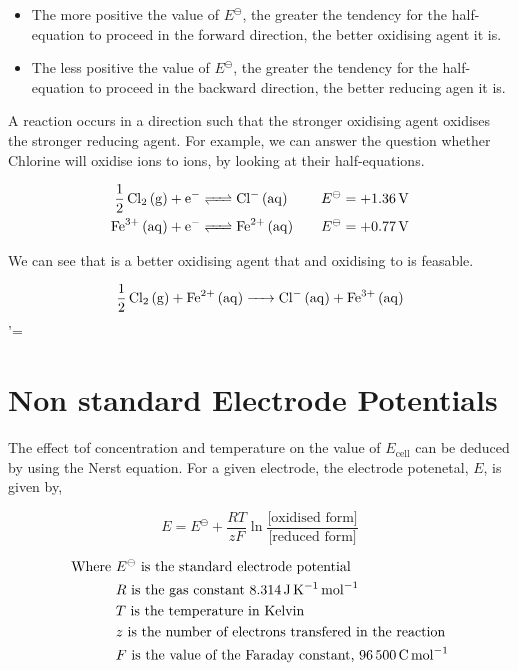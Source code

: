 \documentclass{scrbook}
\begin{document}
	\begin{itemize}
		\item
			The more positive the value of $E^\ominus$, the greater the tendency for the half-equation to proceed in the forward direction, the better oxidising agent it is.
		\item
			The less positive the value of $E^\ominus$, the greater the tendency for the half-equation to proceed in the backward direction, the better reducing agen it is.
	\end{itemize}

	A reaction occurs in a direction such that the stronger oxidising agent oxidises the stronger reducing agent. For example, we can answer the question whether Chlorine will oxidise  ions to  ions, by looking at their half-equations.

	\begin{align*}
		\ce{ 1/2Cl2 (g) + e- &<=> Cl- (aq)} && &E^\ominus &= \SI[explicit-sign=+]{1.36}{\volt} \\
		\ce{ Fe^{3+} (aq) + e- &<=> Fe^{2+} (aq) } && &E^\ominus &= \SI[explicit-sign=+]{0.77}{\volt}
	\end{align*}

	We can see that  is a better oxidising agent that  and  oxidising  to  is feasable.

	\[ \ce{1/2Cl2 (g) + Fe^{2+} (aq) -> Cl- (aq) + Fe^{3+} (aq) } \]'=

\section{Non standard Electrode Potentials}

	The effect tof concentration and temperature on the value of $E_{\text{cell}}$ can be deduced by using the Nerst equation. For a given electrode, the electrode potenetal, $E$, is given by,

	\[ E = E^\ominus + \frac{RT}{zF}\ln{\frac{\text{[oxidised form]}}{\text{[reduced form]}}} \]

	\begin{align*}
		\text{Where } 
		& E^\ominus \text{ is the standard electrode potential} \\
		& R \text{ is the gas constant \SI{8.314}{\joule\per\kelvin\per\mole}} \\
		& T \text{ is the temperature in Kelvin} \\
		& z \text{ is the number of electrons transfered in the reaction} \\
		& F \text{ is the value of the Faraday constant, \SI{96500}{\coulomb\per\mole}}
	\end{align*}
\end{document}
